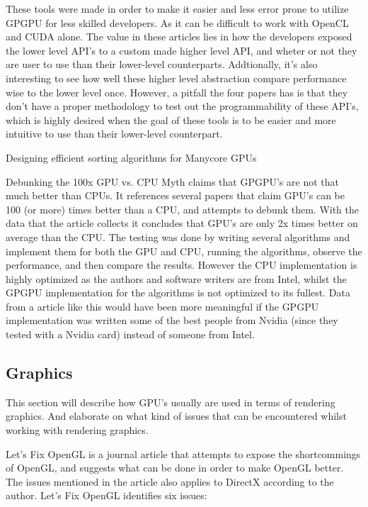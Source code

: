 These tools were made in order to make it easier and less error prone to utilize GPGPU for less skilled developers. As it can be difficult to work with OpenCL and CUDA alone.
The value in these articles lies in how the developers exposed the lower level API's to a custom made higher level API, and wheter or not they are user to use than their lower-level counterparts. Addtionally, it's also interesting to see how well these higher level abstraction compare performance wise to the lower level once. However, a pitfall the four papers has is that they don't have a proper methodology to test out the programmability of these API's, which is highly desired when the goal of these tools is to be easier and more intuitive to use than their lower-level counterpart.

Designing efficient sorting algorithms for Manycore GPUs \cite{satish_2009_designing}

Debunking the 100x GPU vs. CPU Myth \cite{lee_2010_debunking} claims that GPGPU's are not that much better than CPUs. 
It references several papers that claim GPU's can be 100 (or more) times better than a CPU, and attempts to debunk them. 
With the data that the article collects it concludes that GPU's are only 2x times better on average than the CPU. 
The testing was done by writing several algorithms and implement them for both the GPU and CPU, running the algorithms, observe the performance, and then compare the results. 
However the CPU implementation is highly optimized as the authors and software writers are from Intel, whilst the GPGPU implementation for the algorithms is not optimized to its fullest. 
Data from a article like this would have been more meaningful if the GPGPU implementation was written some of the best people from Nvidia (since they tested with a Nvidia card) instead of someone from Intel.

\subsection{Graphics}
This section will describe how GPU's usually are used in terms of rendering graphics. And elaborate on what kind of issues that can be encountered whilst working with rendering graphics.

Let's Fix OpenGL \cite{fix_opengl} is a journal article that attempts to expose the shortcommings of OpenGL, and suggests what can be done in order to make OpenGL better. 
The issues mentioned in the article also applies to DirectX according to the author. 
Let's Fix OpenGL  \cite{fix_opengl} identifies six issues: 
